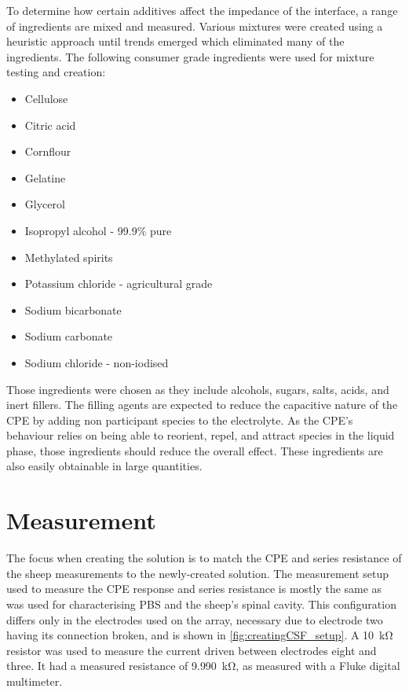   To determine how certain additives affect the impedance of the interface, a range of ingredients are mixed and measured.
  Various mixtures were created using a heuristic approach until trends emerged which eliminated many of the ingredients.
  The following consumer grade ingredients were used for mixture testing and creation:
  \begin{itemize}
    \label{review:listOfIngredients}
      \item Cellulose
      \item Citric acid
      \item Cornflour
      \item Gelatine
      \item Glycerol
      \item Isopropyl alcohol - 99.9\% pure
      \item Methylated spirits
      \item Potassium chloride - agricultural grade
      \item Sodium bicarbonate
      \item Sodium carbonate
      \item Sodium chloride - non-iodised
  \end{itemize}

  Those ingredients were chosen as they include alcohols, sugars, salts, acids, and inert fillers.
  The filling agents are expected to reduce the capacitive nature of the CPE by adding non participant species to the electrolyte.
  As the CPE's behaviour relies on being able to reorient, repel, and attract species in the liquid phase, those ingredients should reduce the overall effect.
  These ingredients are also easily obtainable in large quantities.


\section{Measurement}

  The focus when creating the solution is to match the CPE and series resistance of the sheep measurements to the newly-created solution.
  The measurement setup used to measure the CPE response and series resistance is mostly the same as was used for characterising PBS and the sheep's spinal cavity.
  This configuration differs only in the electrodes used on the array, necessary due to electrode two having its connection broken, and is shown in \cref{fig:creatingCSF_setup}.
  A \SI{10}{\kilo\ohm} resistor was used to measure the current driven between electrodes eight and three.
  It had a measured resistance of \SI{9.990}{\kilo\ohm}, as measured with a Fluke digital multimeter.

